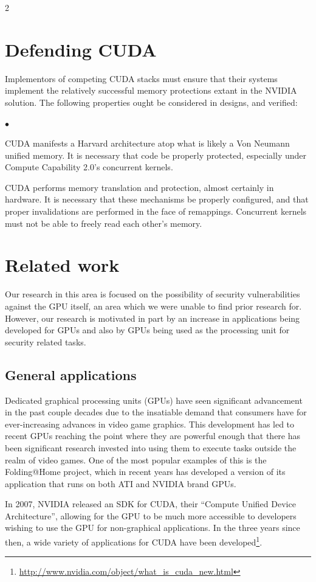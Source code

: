 \documentclass[letterpaper,10pt]{article}
\newcommand{\squishlist}{\begin{list}{$\bullet$}
  {\setlength{\itemsep}{0pt}
    \setlength{\parsep}{3pt}
    \setlength{\topsep}{3pt}
    \setlength{\partopsep}{0pt}
    \setlength{\leftmargin}{1.5em}
    \setlength{\labelwidth}{1em}
    \setlength{\labelsep}{0.5em}
  } }
\newcommand{\squishend}{\end{list}}
\begin{document}
\begin{multicols}{2}
\section{Defending CUDA}
Implementors of competing CUDA stacks must ensure that their systems implement
the relatively successful memory protections extant in the NVIDIA solution. The
following properties ought be considered in designs, and verified:
\squishlist
\item CUDA manifests a Harvard architecture atop what is likely a Von Neumann
unified memory. It is necessary that code be properly protected, especially
under Compute Capability 2.0's concurrent kernels.
\item CUDA performs memory translation and protection, almost certainly in
hardware. It is necessary that these mechanisms be properly configured,
and that proper invalidations are performed in the face of remappings. Concurrent
kernels must not be able to freely read each other's memory.
\squishend
\section{Related work}
Our research in this area is focused on the possibility of security
vulnerabilities against the GPU itself, an area which we were unable to find
prior research for. However, our research is motivated in part by an increase
in applications being developed for GPUs and also by GPUs being used as the
processing unit for security related tasks.
  
\subsection{General applications}
  
  Dedicated graphical processing units (GPUs) have seen significant advancement
in the past couple decades due to the insatiable demand that consumers have for
ever-increasing advances in video game graphics. This development has led to
recent GPUs reaching the point where they are powerful enough that there has
been significant research invested into using them to execute tasks outside the
realm of video games. One of the most popular examples of this is the
Folding@Home project, which in recent years has developed a version of its
application that runs on both ATI and NVIDIA brand GPUs\cite{foldingathome}.
  
  In 2007, NVIDIA released an SDK for CUDA, their ``Compute Unified Device
Architecture'', allowing for the GPU to be much more accessible to developers
wishing to use the GPU for non-graphical applications. In the three years since
then, a wide variety of applications for CUDA have been developed\footnote{\url{http://www.nvidia.com/object/what\_is\_cuda\_new.html}}.
  

\end{multicols}
\end{document}
